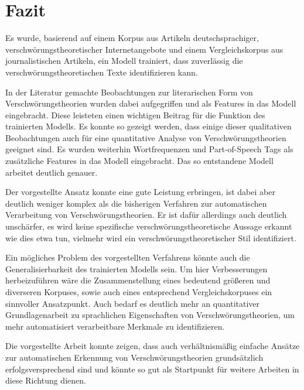 \section{Fazit}

Es wurde, basierend auf einem Korpus aus Artikeln deutschsprachiger, verschwörungstheoretischer Internetangebote und einem Vergleichskorpus aus journalistischen Artikeln, ein Modell trainiert, dass zuverlässig die verschwörungstheoretischen Texte identifizieren kann.

In der Literatur gemachte Beobachtungen zur literarischen Form von Verschwörungstheorien wurden dabei aufgegriffen und als Features in das Modell eingebracht.
Diese leisteten einen wichtigen Beitrag für die Funktion des trainierten Modells.
Es konnte so gezeigt werden, dass einige dieser qualitativen Beobachtungen auch für eine quantitative Analyse von Verschwörungstheorien geeignet sind.
Es wurden weiterhin Wortfrequenzen und Part-of-Speech Tags als zusätzliche Features in das Modell eingebracht.
Das so entstandene Modell arbeitet deutlich genauer.

Der vorgestellte Ansatz konnte eine gute Leistung erbringen, ist dabei aber deutlich weniger komplex als die bisherigen Verfahren zur automatischen Verarbeitung von Verschwörungstheorien.
Er ist dafür allerdings auch deutlich unschärfer, es wird keine spezifische verschwörungstheoretische Aussage erkannt wie dies etwa \textcite[]{samory_2018} tun, vielmehr wird ein verschwörungstheoretischer Stil identifiziert.

Ein mögliches Problem des vorgestellten Verfahrens könnte auch die Generalisierbarkeit des trainierten Modells sein.
Um hier Verbesserungen herbeizuführen wäre die Zusammenstellung eines bedeutend größeren und diverseren Korpuses, sowie auch eines entsprechend Vergleichskorpuses ein sinnvoller Ansatzpunkt.
Auch bedarf es deutlich mehr an quantitativer Grundlagenarbeit zu sprachlichen Eigenschaften von Verschwörungstheorien, um mehr automatisiert verarbeitbare Merkmale zu identifizieren.

Die vorgestellte Arbeit konnte zeigen, dass auch verhältnismäßig einfache Ansätze zur automatischen Erkennung von Verschwörungstheorien grundsätzlich erfolgsversprechend sind und könnte so gut als Startpunkt für weitere Arbeiten in diese Richtung dienen.